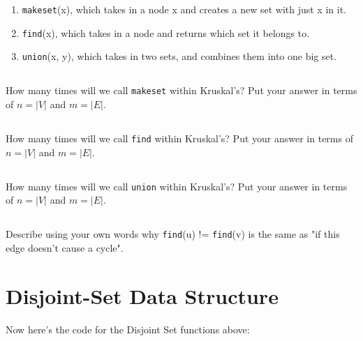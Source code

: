 \documentclass [12pt]{article}
\begin{document}
\begin{enumerate}
  \item \texttt{makeset}(x), which takes in a node x and creates a new set with just x in it.
  \item \texttt{find}(x), which takes in a node and returns which set it belongs to.
  \item \texttt{union}(x, y), which takes in two sets, and combines them into one big set.
\end{enumerate}

\subsection{}
How many times will we call \texttt{makeset} within Kruskal's? Put your answer in terms of $n = |V|$ and $m = |E|$.


\subsection{}
How many times will we call \texttt{find} within Kruskal's? Put your answer in terms of $n = |V|$ and $m = |E|$.


\subsection{}
How many times will we call \texttt{union} within Kruskal's? Put your answer in terms of $n = |V|$ and $m = |E|$.


\subsection{}
Describe using your own words why \texttt{find}(u) != \texttt{find}(v) is the same as "if this edge doesn't cause a cycle".



\pagebreak
\section{Disjoint-Set Data Structure }
Now here's the code for the Disjoint Set functions above:
\end{document}
